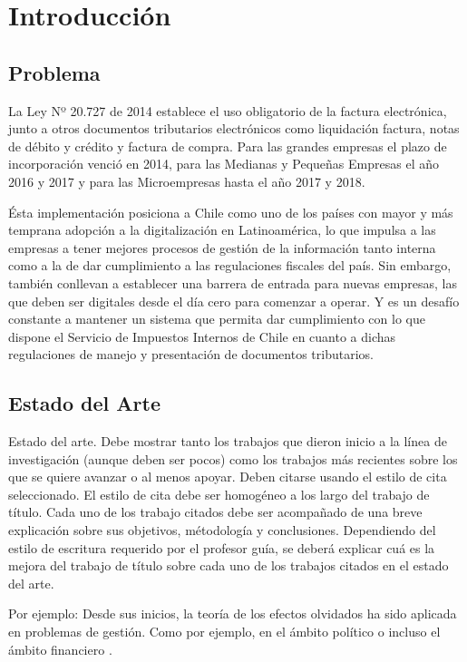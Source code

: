 \chapter{Introducción}
\section{Problema}
La Ley Nº 20.727 de 2014 establece el uso obligatorio de la factura electrónica, junto a otros documentos tributarios electrónicos como liquidación factura, notas de débito y crédito y factura de compra. Para las grandes empresas el plazo de incorporación venció en 2014, para las Medianas y Pequeñas Empresas el año 2016 y 2017 y para las Microempresas hasta el año 2017 y 2018.

Ésta implementación posiciona a Chile como uno de los países con mayor y más temprana adopción a la digitalización en Latinoamérica, lo que impulsa a las empresas a tener mejores procesos de gestión de la información tanto interna como a la de dar cumplimiento a las regulaciones fiscales del país. Sin embargo, también conllevan a establecer una barrera de entrada para nuevas empresas, las que deben ser digitales desde el día cero para comenzar a operar. Y es un desafío constante a mantener un sistema que permita dar cumplimiento con lo que dispone el Servicio de Impuestos Internos de Chile en cuanto a dichas regulaciones de manejo y presentación de documentos tributarios.

\section{Estado del Arte}
Estado del arte. Debe mostrar tanto los trabajos que dieron inicio a la línea de investigación (aunque deben ser pocos) como los trabajos más recientes sobre los que se quiere avanzar o al menos apoyar. Deben citarse usando el estilo de cita seleccionado. El estilo de cita debe ser homogéneo a los largo del trabajo de título. Cada uno de los trabajo citados debe ser acompañado de una breve explicación sobre sus objetivos, métodología y conclusiones. Dependiendo del estilo de escritura requerido por el profesor guía, se deberá explicar cuá es la mejora del trabajo de título sobre cada uno de los trabajos citados en el estado del arte.

Por ejemplo: Desde sus inicios, la teoría de los efectos olvidados ha sido aplicada en problemas de gestión. Como por ejemplo, en el ámbito político \parencite[105-126]{kaufmann1988modelos} o incluso el ámbito financiero \parencite[127-151]{kaufmann1988modelos}. 

